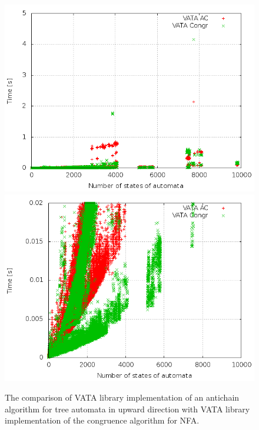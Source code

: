 \begin{figure}[bt]
\begin{center}
\includegraphics[scale=0.3]{fig/plot_ac_zprava.png}
\includegraphics[scale=0.3]{fig/plot_ac_step_zprava.png}
\caption{The comparison of VATA library implementation of an antichain algorithm for tree automata in upward direction
    with VATA library implementation of the congruence algorithm for NFA.}
\label{fig:figPlotAc}
\end{center}
\end{figure}

